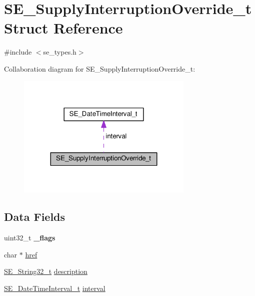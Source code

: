 \hypertarget{structSE__SupplyInterruptionOverride__t}{}\section{S\+E\+\_\+\+Supply\+Interruption\+Override\+\_\+t Struct Reference}
\label{structSE__SupplyInterruptionOverride__t}


{\ttfamily \#include $<$se\+\_\+types.\+h$>$}



Collaboration diagram for S\+E\+\_\+\+Supply\+Interruption\+Override\+\_\+t\+:\nopagebreak
\begin{figure}[H]
\begin{center}
\leavevmode
\includegraphics[width=239pt]{structSE__SupplyInterruptionOverride__t__coll__graph}
\end{center}
\end{figure}
\subsection*{Data Fields}
\begin{DoxyCompactItemize}
\item 
uint32\+\_\+t {\bfseries \+\_\+flags}
\item 
char $\ast$ \hyperlink{group__SupplyInterruptionOverride_ga70c5ab94b2f05661715eb2a3db266774}{href}
\item 
\hyperlink{group__String32_gac9f59b06b168b4d2e0d45ed41699af42}{S\+E\+\_\+\+String32\+\_\+t} \hyperlink{group__SupplyInterruptionOverride_ga767528d74873c66ccdc1a25173c7fab1}{description}
\item 
\hyperlink{structSE__DateTimeInterval__t}{S\+E\+\_\+\+Date\+Time\+Interval\+\_\+t} \hyperlink{group__SupplyInterruptionOverride_ga2b48753110e59127cbe7b7a2886512ea}{interval}
\end{DoxyCompactItemize}


